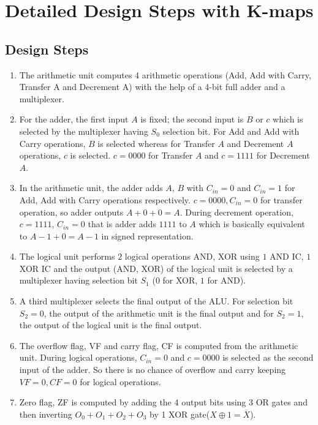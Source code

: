 \documentclass[12pt]{article}
\begin{document}
\newpage
\section{\large{Detailed Design Steps with K-maps}}

\subsection{Design Steps}
\begin{enumerate}
    \item The arithmetic unit computes 4 arithmetic operations (Add, Add with Carry, Transfer A and Decrement A) with the help of a 4-bit full adder and a multiplexer.

    \item For the adder, the first input $A$ is fixed; the second input is $B$ or $c$ which is selected by the multiplexer having $S_0$ selection bit. For Add and Add with Carry operations, $B$ is selected whereas for Transfer $A$ and Decrement $A$ operations, $c$ is selected. $c=0000$ for Transfer $A$ and $c=1111$ for Decrement $A$.

    \item In the arithmetic unit, the adder adds $A$, $B$ with $C_{in}=0$ and $C_{in}=1$ for Add, Add with Carry operations respectively. $c=0000, C_{in}=0$ for transfer operation, so adder outputs $A+0+0=A$. During decrement operation, $c=1111$, $C_{in}=0$ that is adder adds $1111$ to $A$ which is basically equivalent to $A-1+0=A-1$ in signed representation.

    \item The logical unit performs $2$ logical operations AND, XOR using $1$ AND IC, $1$ XOR IC and the output (AND, XOR) of the logical unit is selected by a multiplexer having selection bit $S_1$ ($0$ for XOR, $1$ for AND).

    \item A third multiplexer selects the final output of the ALU. For selection bit $S_2=0$, the output of the arithmetic unit is the final output and for $S_2=1$, the output of the logical unit is the final output.

    \item The overflow flag, VF and carry flag, CF is computed from the arithmetic unit. During logical operations, $C_{in}=0$ and $c=0000$ is selected as the second input of the adder. So there is no chance of overflow and carry keeping $VF=0, CF=0$ for logical operations.

    \item Zero flag, ZF is computed by adding the 4 output bits using 3 OR gates and then inverting $O_0 + O_1+O_2+O_3$ by 1 XOR gate($X\oplus1=\overline{X}$).

\end{enumerate}
\end{document}
